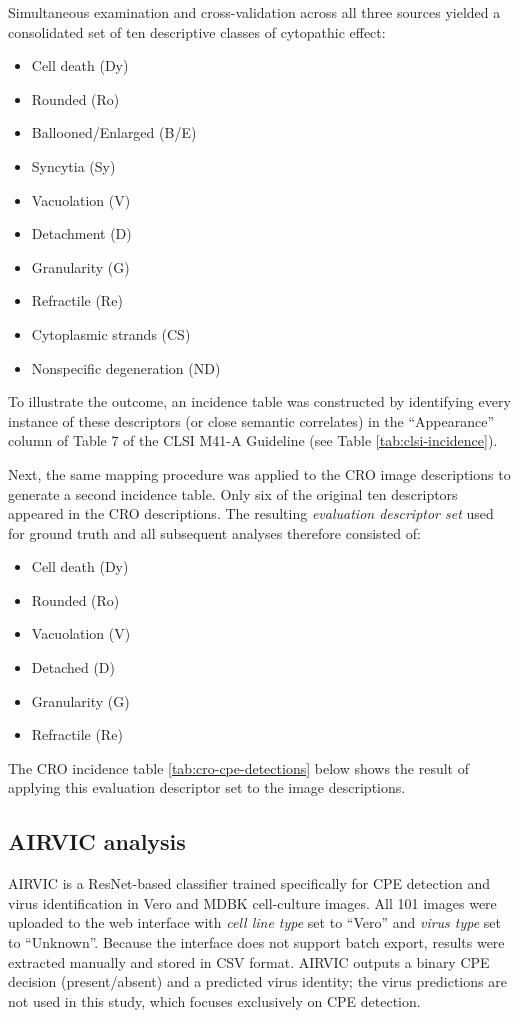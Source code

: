 Simultaneous examination and cross-validation across all three sources yielded a consolidated set of ten descriptive classes of cytopathic effect: 
\begin{itemize}
    \item Cell death (Dy)
    \item Rounded (Ro)
    \item Ballooned/Enlarged (B/E)
    \item Syncytia (Sy)
    \item Vacuolation (V)
    \item Detachment (D)
    \item Granularity (G)
    \item Refractile (Re)
    \item Cytoplasmic strands (CS)
    \item Nonspecific degeneration (ND)
\end{itemize}
\clearpage
To illustrate the outcome, an incidence table was constructed by identifying every instance of these descriptors (or close semantic correlates) in the ``Appearance'' column of Table 7 of the CLSI M41-A Guideline (see Table \ref{tab:clsi-incidence}).


Next, the same mapping procedure was applied to the CRO image descriptions to generate a second incidence table. Only six of the original ten descriptors appeared in the CRO descriptions. The resulting \textit{evaluation descriptor set} used for ground truth and all subsequent analyses therefore consisted of: 
\begin{itemize}
    \item Cell death (Dy)
    \item Rounded (Ro)
    \item Vacuolation (V)
    \item Detached (D)
    \item Granularity (G)
    \item Refractile (Re)
\end{itemize}

The CRO incidence table \ref{tab:cro-cpe-detections} below shows the result of applying this evaluation descriptor set to the image descriptions.


\clearpage
\subsection*{AIRVIC analysis}
AIRVIC \cite{airvic} is a ResNet-based classifier trained specifically for CPE detection and virus identification in Vero and MDBK cell-culture images. All 101 images were uploaded to the web interface \cite{airvicweb} with \textit{cell line type} set to ``Vero'' and \textit{virus type} set to ``Unknown''. Because the interface does not support batch export, results were extracted manually and stored in CSV format. AIRVIC outputs a binary CPE decision (present/absent) and a predicted virus identity; the virus predictions are not used in this study, which focuses exclusively on CPE detection.

